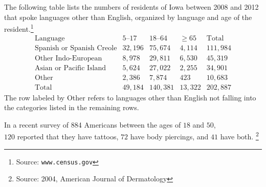 \documentclass[addpoints,12pt]{exam}
\begin{document}
\begin{questions}
\question[18] The following table lists the numbers
of residents of Iowa between 2008 and 2012 that
spoke languages other than English, organized by
language and age
of the resident.\footnote{Source: {\tt www.census.gov}}
\[\begin{array}{r|rrr|r}
\text{Language}&\text{$5$--$17$}
&\text{$18$--$64$}&\ge 65&\text{Total}\\\hline
\text{Spanish or Spanish Creole}&32,196&75,674&4,114&111,984\\
\text{Other Indo-European}&8,978&29,811&6,530&45,319\\
\text{Asian or Pacific Island}&5,624&27,022&2,255&34,901\\
\text{Other}&2,386&7,874&423&10,683\\\hline
\text{Total}&49,184&140,381&13,322&202,887
\end{array}\]
The row labeled by Other refers to languages
other than English not falling into the categories
listed in the remaining rows.

\question[24] In a recent survey of 884 Americans between the ages
of $18$ and $50$,\\ $120$ reported that they have tattoos,
$72$ have body piercings, and $41$ have both.
\footnote{Source: 2004, American Journal of Dermatology}


\end{questions}
\end{document}
